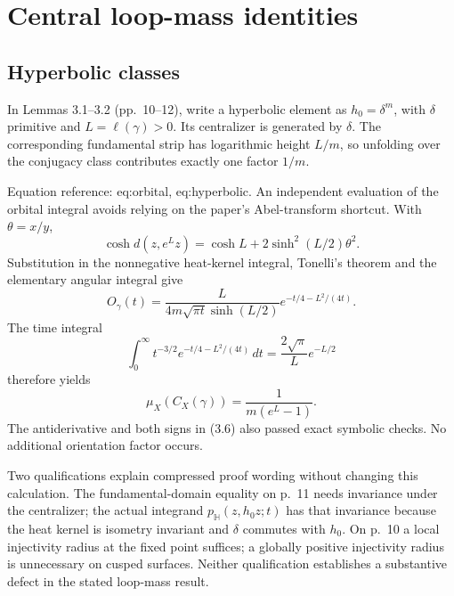 \documentclass[10pt]{article}
\begin{document}
\section*{Central loop-mass identities}
\subsection*{Hyperbolic classes}
In Lemmas 3.1–3.2 (pp. 10–12), write a hyperbolic element as \(h_0=\delta^m\), with \(\delta\) primitive and \(L=\ell(\gamma)>0\). Its centralizer is generated by \(\delta\). The corresponding fundamental strip has logarithmic height \(L/m\), so unfolding over the conjugacy class contributes exactly one factor \(1/m\).\par
Equation reference: eq:orbital, eq:hyperbolic. An independent evaluation of the orbital integral avoids relying on the paper’s Abel-transform shortcut. With \(\theta=x/y\), \[\cosh d(z,e^Lz)=\cosh L+2\sinh^2(L/2)\theta^2.\] Substitution in the nonnegative heat-kernel integral, Tonelli’s theorem and the elementary angular integral give \[
 O_\gamma(t)=
 \frac{L}{4m\sqrt{\pi t}\sinh(L/2)}
       e^{-t/4-L^2/(4t)}.\] The time integral \[\int_0^\infty t^{-3/2}e^{-t/4-L^2/(4t)}\,dt
     =\frac{2\sqrt\pi}{L}e^{-L/2}\] therefore yields \[
 \mu_X(C_X(\gamma))=\frac{1}{m(e^L-1)}.\] The antiderivative and both signs in (3.6) also passed exact symbolic checks. No additional orientation factor occurs.\par
Two qualifications explain compressed proof wording without changing this calculation. The fundamental-domain equality on p. 11 needs invariance under the centralizer; the actual integrand \(p_{\mathbb H}(z,h_0z;t)\) has that invariance because the heat kernel is isometry invariant and \(\delta\) commutes with \(h_0\). On p. 10 a local injectivity radius at the fixed point suffices; a globally positive injectivity radius is unnecessary on cusped surfaces. Neither qualification establishes a substantive defect in the stated loop-mass result.\par
\end{document}

